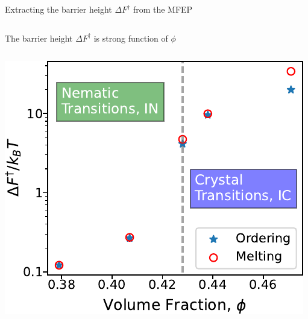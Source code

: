 \documentclass[aspectratio=169]{beamer}
\begin{document}
\begin{frame}[c]{Extracting the barrier height $\Delta F^{\dagger}$ from the MFEP}
\begin{columns}[T, onlytextwidth]
  \end{columns}

  \par 



\end{frame}

\begin{frame}[c]{The barrier height $\Delta F^{\dagger}$ is strong function of $\phi$}

  \centering
  \vspace{0.5\baselineskip}

  \begin{columns}[T]

  \includegraphics[]{../figures/ch4_jcp/fig-heights_vs_phi/fig-heights_vs_phi.pdf}


\end{columns}
\end{frame}
\end{document}
